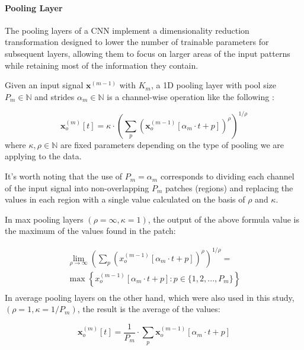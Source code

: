\paragraph{Pooling Layer}
The pooling layers of a CNN implement a dimensionality reduction transformation designed to lower the number of trainable parameters for subsequent layers, allowing them to focus on larger areas of the input patterns while retaining most of the information they contain.

Given an input signal $\boldsymbol{x}^{(m-1)}$ with $K_m$, a 1D pooling layer with pool size $P_{m} \in \mathbb{N}$ and strides $\alpha_{m} \in \mathbb{N}$ is a channel-wise operation like the following \cite{cnnbook}:

$$
\boldsymbol{x}_{o}^{(m)}[t] = \kappa \cdot \left( \sum_{p} \left(\boldsymbol{x}_{o}^{(m-1)} \left[\alpha_{m} \cdot t + p \right] \right)^{\rho}\right)^{1 / \rho}
$$
where $\kappa, \rho \in \mathbb{N}$ are fixed parameters depending on the type of pooling we are applying to the data.

It's worth noting that the use of $P_{m}=\alpha_{m}$ corresponds to dividing each channel of the input signal into non-overlapping $P_{m}$ patches (regions) and replacing the values in each region with a single value calculated on the basis of $\rho$ and $\kappa$.

In max pooling layers $(\rho = \infty, \kappa = 1)$, the output of the above formula value is the maximum of the values found in the patch:

$$
\begin{gathered}
	\lim_{\rho \to \infty} \left(\sum_{p} \left(x^{(m-1)}_o\left[\alpha_{m} \cdot t + p\right]\right)^\rho \right)^{1/\rho} = \\
	\max \left\{x^{(m-1)}_o\left[\alpha_{m} \cdot t + p\right] : p \in \{1, 2, ..., P_m\}\right\} \\
\end{gathered}
$$
In average pooling layers on the other hand, which were also used in this study, $(\rho = 1, \kappa = 1/P_m)$, the result is the average of the values:

$$
\boldsymbol{x}_{o}^{(m)}[t] = \frac{1}{P_m} \cdot \sum_{p} \boldsymbol{x}_{o}^{(m-1)} \left[\alpha_{m} \cdot t + p \right]
$$
	
